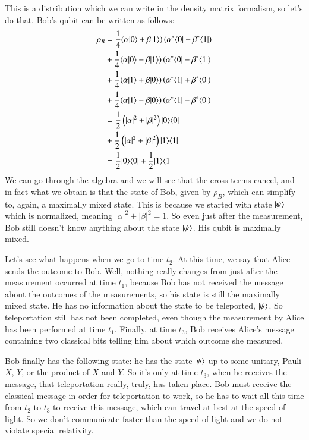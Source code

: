 This is a distribution which we can write in the density matrix formalism, so let's do that. Bob's qubit can be written as follows:
\begin{equation}
\begin{aligned}
\rho_B &=\frac{1}{4}(\alpha|0\rangle+\beta|1\rangle)\left(\alpha^*\langle 0|+\beta^*\langle 1|\right) \\
&+\frac{1}{4}(\alpha|0\rangle-\beta|1\rangle)\left(\alpha^*\langle 0|-\beta^*\langle 1|\right) \\
&+\frac{1}{4}(\alpha|1\rangle+\beta|0\rangle)\left(\alpha^*\langle 1|+\beta^*\langle 0|\right) \\
&+\frac{1}{4}(\alpha|1\rangle-\beta|0\rangle)\left(\alpha^*\langle 1|-\beta^*\langle 0|\right) \\
&=\frac{1}{2}\left(|\alpha|^2+|\beta|^2\right)|0 \rangle \langle 0| \\
&+\frac{1}{2}\left(|\alpha|^2+|\beta|^2\right)|1 \rangle \langle 1| \\
&=\frac{1}{2}|0 \rangle \langle 0|+\frac{1}{2}|1 \rangle \langle 1|
\end{aligned}
\end{equation}
We can go through the algebra and we will see that the cross terms cancel, and in fact what we obtain is that the state of Bob, given by $\rho_B$, which can simplify to, again, a maximally mixed state. This is because we started with state $\left| \psi \right\rangle$ which is normalized, meaning $|\alpha|^2+|\beta|^2 = 1$. So even just after the measurement, Bob still doesn't know anything about the state $\left| \psi \right\rangle$. His qubit is maximally mixed.

Let's see what happens when we go to time $t_2$. At this time, we say that Alice sends the outcome to Bob. Well, nothing really changes from just after the measurement occurred at time $t_1$, because Bob has not received the message about the outcomes of the measurements, so his state is still the maximally mixed state. He has no information about the state to be teleported, $\left| \psi \right\rangle$. So teleportation still has not been completed, even though the measurement by Alice has been performed at time $t_1$. Finally, at time $t_3$, Bob receives Alice's message containing two classical bits telling him about which outcome she measured.

Bob finally has the following state: he has the state $\left| \psi \right\rangle$ up to some unitary, Pauli $X$, $Y$, or the product of $X$ and $Y$. So it's only at time $t_3$, when he receives the message, that teleportation really, truly, has taken place. Bob must receive the classical message in order for teleportation to work, so he has to wait all this time from $t_2$ to $t_3$ to receive this message, which can travel at best at the speed of light. So we don't communicate faster than the speed of light and we do not violate special relativity.


